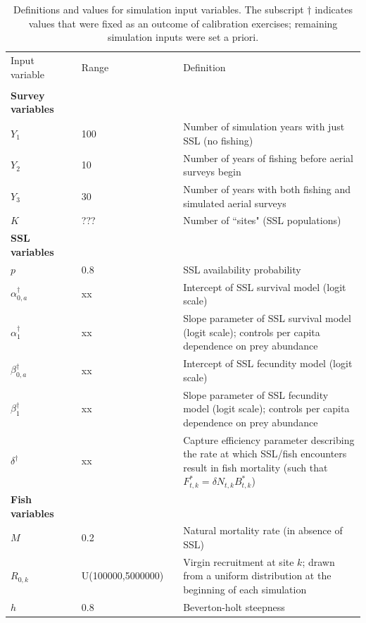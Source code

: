 \documentclass[nonumbib,leqno]{nrc1}
\begin{document}
\begin{table}
\caption{ \large Definitions and values for simulation input variables.  The subscript $\dag$
indicates values that were fixed as an outcome of calibration exercises; remaining simulation inputs were
set a priori.}
\label{tab:inputs}
\begin{tabular}{p{3cm}lll p{9cm}}
\\
\hline \hline
Input variable & & Range & & Definition\\
\cline{1-1} \cline{3-3} \cline{5-5}
\\
\multicolumn{1}{l}{\textbf{Survey variables}}  \\
$Y_1$ & & 100 & & Number of simulation years with just SSL (no fishing) \\
$Y_2$ & & 10 & & Number of years of fishing before aerial surveys begin \\
$Y_3$ & & 30 & & Number of years with both fishing and simulated aerial surveys \\
$K$ & & ??? & & Number of ``sites" (SSL populations)  \\
\midrule
\multicolumn{1}{l}{\textbf{SSL variables}}  \\
$p$ & & 0.8 & & SSL availability probability \\
$\alpha_{0,a}^\dag$ & & xx & & Intercept of SSL survival model (logit scale) \\
$\alpha_1^\dag$ & & xx & & Slope parameter of SSL survival model (logit scale); controls per capita dependence
                     on prey abundance \\
$\beta_{0,a}^\dag$ & & xx & & Intercept of SSL fecundity model (logit scale) \\
$\beta_1^\dag$ & & xx & & Slope parameter of SSL fecundity model (logit scale); controls per capita dependence
                    on prey abundance \\
$\delta^\dag$ & & xx & & Capture efficiency parameter describing the rate at which SSL/fish encounters result in fish mortality (such that $F_{t,k}^*=\delta N_{t,k} B_{t,k}^*$) \\
\midrule
\multicolumn{1}{l}{\textbf{Fish variables}}  \\
$M$ & & 0.2 & & Natural mortality rate (in absence of SSL) \\ [2pt]
$R_{0,k}$ & & U(100000,5000000) & & Virgin recruitment at site $k$; drawn from a uniform distribution at the beginning of each simulation \\
$h$ & & 0.8 & & Beverton-holt steepness \\

\end{tabular}
\end{table}
\end{document}
